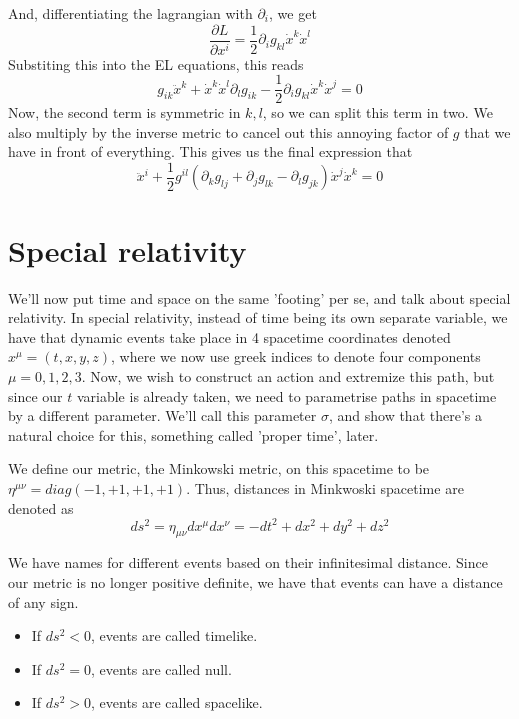 \documentclass[11pt, a4paper]{article}   	%
\theoremstyle{slplain}
\begin{document}
And, differentiating the lagrangian with $\partial_i$, we get
\[ 
\frac{ \partial L}{ \partial x^i} = \frac{ 1}{2} \partial_i g_{kl} \dot{x}^k \dot{x}^l \]
Substiting this into the EL equations, this reads 
\[ 
g_{ik} \ddot{x}^k + \dot{x}^k \dot{x}^l \partial_l g_{ ik}  - \frac{1}{2} \partial_i g_{kl} \dot{x}^k \dot{x}^j  =0 
\]  
Now, the second term is symmetric in $k, l$, so we can split this term in two. We also multiply by the inverse metric to cancel out this annoying factor of $g$ that we have in front of everything. This gives us the final expression that 
\[ 
\ddot{x}^i + \frac{1}{2} g^{il} \left( \partial_k g_{lj} + \partial_j g_{lk}  - \partial_l g_{jk} \right) \dot{x}^j \dot{x}^k = 0
\] 

\section{Special relativity} 
We'll now put time and space on the same 'footing' per se, and talk about special relativity. In special relativity, instead of time being its own separate variable, we have that dynamic events take place in 4 spacetime coordinates denoted $x^\mu  = (t, x, y, z)$, where we now use greek indices to denote four components $\mu = 0, 1, 2 , 3$. Now, we wish to construct an action and extremize this path, but since our $t$ variable is already taken, we need to parametrise paths in spacetime by a different parameter. We'll call this parameter $\sigma$, and show that there's a natural choice for this, something called 'proper time', later. 

We define our metric, the Minkowski metric, on this spacetime to be $\eta^{ \mu\nu} = diag( -1, +1, +1, +1) $. Thus, distances in Minkwoski spacetime are denoted as \[ 
ds^2  = \eta_{ \mu \nu} dx^\mu dx^\nu  =  -dt^2 + dx^2 + dy^2 + dz^2 \] 

We have names for different events based on their infinitesimal distance. Since our metric is no longer positive definite, we have that events can have a distance of any sign. 

\begin{itemize} 
\item If $ds^2 < 0$, events are called timelike. 
\item If $ds^2 = 0$, events are called null. 
\item If $ds^2 > 0$, events are called spacelike. 
\end{itemize} 
\end{document}
